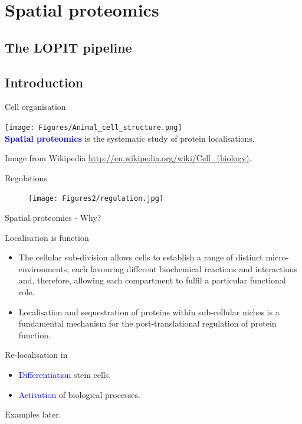 \section{Spatial proteomics}

\subsection{The LOPIT pipeline}

\subsection*{Introduction}


\label{sec:spspatprot}

\begin{frame}{Cell organisation}
  \begin{center}
    \texttt{[image: Figures/Animal\_cell\_structure.png]} \\
    \textbf{\textcolor{Blue}{Spatial proteomics}} is the systematic
    study of protein localisations.
  \end{center}

  \tiny Image from Wikipedia
  \url{http://en.wikipedia.org/wiki/Cell_(biology)}.
\end{frame}

\begin{frame}{Regulations}
  \begin{figure}[h]
    \centering
    \texttt{[image: Figures2/regulation.jpg]}
  \end{figure}
\end{frame}

\begin{frame}{Spatial proteomics - Why?}
  \begin{block}{Localisation is function}
    \begin{itemize}
    \item The cellular sub-division allows cells to establish a range
      of distinct micro-environments, each favouring different
      biochemical reactions and interactions and, therefore, allowing
      each compartment to fulfil a particular functional role.
    \item Localisation and sequestration of proteins within
      sub-cellular niches is a fundamental mechanism for the
      post-translational regulation of protein function.
    \end{itemize}
  \end{block}
  \begin{block}{Re-localisation in}
    \begin{itemize}
    \item \textcolor{Blue}{Differentiation} stem cells.
    \item \textcolor{Blue}{Activation} of biological processes.
    \end{itemize}
    Examples later.
  \end{block}
\end{frame}

